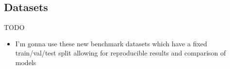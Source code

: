 \subsection*{Datasets}
TODO
\begin{itemize}
    \item I'm gonna use these new benchmark datasets which have a fixed train/val/test
    split allowing for reproducible results and comparison of models
\end{itemize}